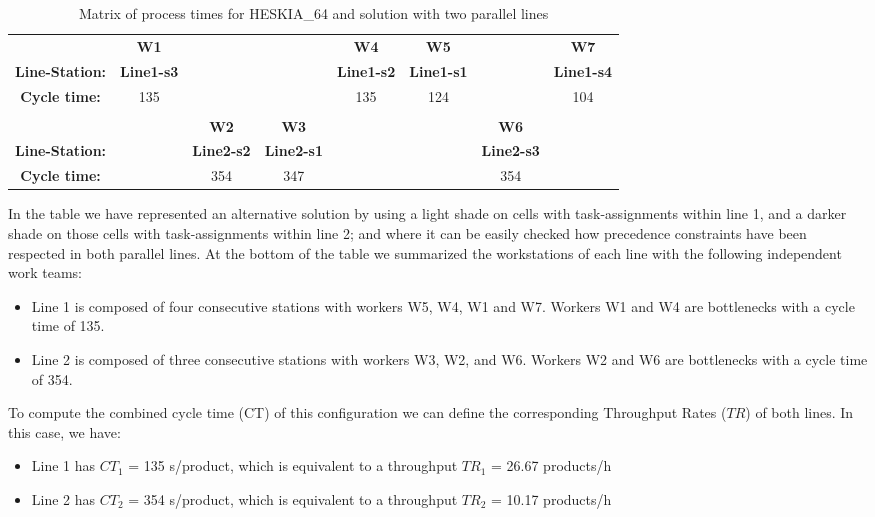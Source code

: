 \documentclass{singlecol-new}
\begin{document}
\begin{table}[!ht]
{\begin{tabular}{cccccccc}
    {\bf } &   {\bf W1} &     {\bf } &     {\bf } &   {\bf W4} &   {\bf W5} &     {\bf } &   {\bf W7} \\

{\bf Line-Station:} & {\bf Line1-s3} &     {\bf } &     {\bf } & {\bf Line1-s2} & {\bf Line1-s1} &     {\bf } & {\bf Line1-s4} \\
\hline
{\bf Cycle time:} &        135 &            &            &        135 &        124 &            &        104 \\

    {\bf } &     {\bf } &     {\bf } &     {\bf } &     {\bf } &     {\bf } &     {\bf } &     {\bf } \\

    {\bf } &     {\bf } &   {\bf W2} &   {\bf W3} &     {\bf } &     {\bf } &   {\bf W6} &     {\bf } \\

{\bf Line-Station:} &     {\bf } & {\bf Line2-s2} & {\bf Line2-s1} &     {\bf } &     {\bf } & {\bf Line2-s3} &     {\bf } \\
\hline
{\bf Cycle time:} &            &        354 &        347 &            &            &        354 &            \\
\hline
\end{tabular}
}
\caption{Matrix of process times for HESKIA\_64 and solution with two parallel lines}
\label{tab:heskia_64}
\end{table}

In the table we have represented an alternative solution by using a light shade on cells with task-assignments within line 1, and a darker shade on those cells with task-assignments within line 2; and where it can be easily checked how precedence constraints have been respected in both parallel lines. At the bottom of the table we summarized the workstations of each line with the following independent work teams:
\begin{itemize}
	\item Line 1 is composed of four consecutive stations with workers W5, W4, W1 and W7. Workers W1 and W4 are bottlenecks with a cycle time of 135.
	\item Line 2 is composed of three consecutive stations with workers W3, W2, and W6. Workers W2 and W6 are bottlenecks with a cycle time of 354.
\end{itemize}

To compute the combined cycle time (CT) of this configuration we can define the corresponding Throughput Rates ($TR$) of both lines. In this case, we have: 
\begin{itemize}
	\item Line 1 has $CT_1$ = 135 s/product, which is equivalent to a throughput  $TR_1$ = 26.67 products/h
	\item Line 2 has $CT_2$ = 354 s/product, which is equivalent to a throughput $TR_2$ = 10.17 products/h
\end{itemize}
\end{document}
